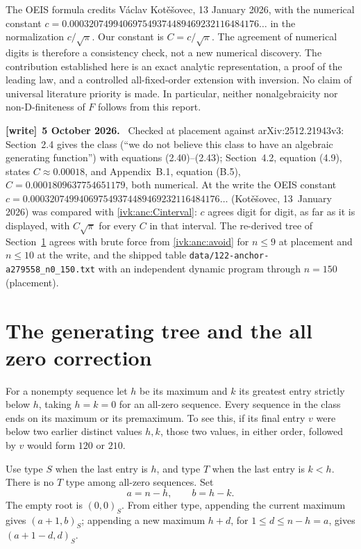 \documentclass[11pt,letterpaper]{article}
\theoremstyle{remark}\newtheorem{remark}[theorem]{Remark}
\newcommand{\file}[1]{\nolinkurl{#1}}
\newenvironment{writenote}[1][]{\par\smallskip\begingroup\small
 \noindent\textbf{[write]}\if\relax\detokenize{#1}\relax\else~\textbf{#1.}\fi\ }%
 {\par\endgroup\smallskip}
\begin{document}
The OEIS formula credits V\'aclav Kot\v{e}\v{s}ovec, 13 January 2026,
with the numerical constant
$c=0.000320749940697549374489469232116484176\ldots$
in the normalization $c/\sqrt\pi$. Our constant is $C=c/\sqrt\pi$.
The agreement of numerical digits is therefore a consistency check,
not a new numerical discovery. The contribution established here is
an exact analytic representation, a proof of the leading law, and a
controlled all-fixed-order extension with inversion. No claim of
universal literature priority is made. In particular, neither
nonalgebraicity nor non-D-finiteness of $F$ follows from this report.
\begin{writenote}[5 October 2026]
Checked at placement against arXiv:2512.21943v3: Section~2.4 gives the class (``we do not believe this class to have an algebraic generating function'') with equations (2.40)--(2.43); Section~4.2, equation (4.9), states $C\approx0.00018$, and Appendix~B.1, equation (B.5), $C=0.0001809637754651179$, both numerical. At the write the OEIS constant $c=0.000320749940697549374489469232116484176\ldots$ (Kot\v{e}\v{s}ovec, 13~January 2026) was compared with \eqref{ivk:anc:Cinterval}: $c$ agrees digit for digit, as far as it is displayed, with $C\sqrt\pi$ for every $C$ in that interval. The re-derived tree of Section~\ref{ivk:anc:sec:tree} agrees with brute force from \eqref{ivk:anc:avoid} for $n\le9$ at placement and $n\le10$ at the write, and the shipped table \file{data/122-anchor-a279558_n0_150.txt} with an independent dynamic program through $n=150$ (placement).
\end{writenote}


\section{The generating tree and the all zero correction}\label{ivk:anc:sec:tree}
For a nonempty sequence let $h$ be its maximum and $k$ its greatest
entry strictly below $h$, taking $h=k=0$ for an all-zero sequence.
Every sequence in the class ends on its maximum or its premaximum.
To see this, if its final entry $v$ were below two earlier distinct
values $h,k$, those two values, in either order, followed by $v$
would form $120$ or $210$.

Use type $S$ when the last entry is $h$, and type $T$ when the last
entry is $k<h$. There is no $T$ type among all-zero sequences.
Set
\begin{equation}\label{ivk:anc:labels}
 a=n-h,\qquad b=h-k.
\end{equation}
The empty root is $(0,0)_S$. From either type, appending the current
maximum gives $(a+1,b)_S$; appending a new maximum $h+d$, for
$1\le d\le n-h=a$, gives $(a+1-d,d)_S$.
\end{document}
